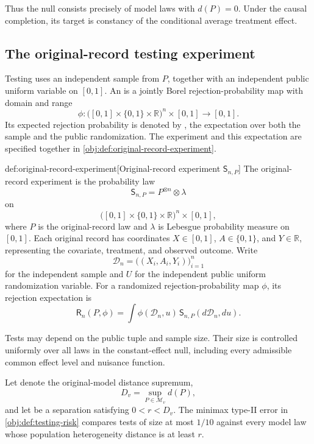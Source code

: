 Thus the null consists precisely of model laws with \(d(P)=0\). Under the causal completion, its target is constancy of the conditional average treatment effect.

\subsection{The original-record testing experiment}

Testing uses an independent sample  from \(P\), together with an independent public uniform variable  on \([0,1]\). An  is a jointly Borel rejection-probability map  with domain and range
\[
\phi:
\bigl([0,1]\times\{0,1\}\times\mathbb R\bigr)^n\times[0,1]
\longrightarrow[0,1].
\]
Its expected rejection probability is denoted by , the expectation over both the sample and the public randomization. The experiment and this expectation are specified together in \cref{obj:def:original-record-experiment}.

\begin{definitionv}{def:original-record-experiment}[Original-record experiment \(\mathsf S_{n,P}\)]
The original-record experiment is the probability law
\[
\mathsf S_{n,P}=P^{\otimes n}\otimes\lambda
\]
on
\[
\bigl([0,1]\times\{0,1\}\times\mathbb R\bigr)^n\times[0,1],
\]
where \(P\) is the original-record law and \(\lambda\) is Lebesgue probability measure on \([0,1]\). Each original record has coordinates \(X\in[0,1]\), \(A\in\{0,1\}\), and \(Y\in\mathbb R\), representing the covariate, treatment, and observed outcome. Write
\[
\mathcal D_n=\bigl((X_i,A_i,Y_i)\bigr)_{i=1}^n
\]
for the independent sample and \(U\) for the independent public uniform randomization variable. For a randomized rejection-probability map \(\phi\), its rejection expectation is
\[
\mathsf R_n(P,\phi)
=
\int\phi(\mathcal D_n,u)\,
\mathsf S_{n,P}(d\mathcal D_n,du).
\]
\end{definitionv}

Tests may depend on the public tuple and sample size. Their size is controlled uniformly over all laws in the constant-effect null, including every admissible common effect level and nuisance function.

Let  denote the original-model distance supremum,
\[
D_v=\sup_{P\in\mathcal M_v}d(P),
\]
and let  be a separation satisfying \(0<r<D_v\). The minimax type-II error  in \cref{obj:def:testing-risk} compares tests of size at most \(1/10\) against every model law whose population heterogeneity distance is at least \(r\).

